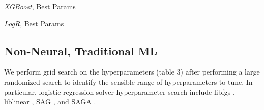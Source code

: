 \documentclass[11pt]{article}
\begin{document}
\begin{table}
\begin{subtable}{0.23\textwidth}
\centering
{}
\caption{\textit{XGBoost}, Best Params }\label{tabla4.1}
\end{subtable}
    \hfil
\begin{subtable}{0.23\textwidth}
\centering
{}
\caption{\textit{LogR}, Best Params }\label{tabla4.1}
\end{subtable}
\caption{Hyperparameters, non-neural models.}
\end{table}
\subsection{Non-Neural, Traditional ML}
We perform grid search on the hyperparameters (table 3) after performing a large randomized search to identify the sensible range of hyperparameters to tune. In particular, logistic regression solver hyperparameter search include libfgs \citep{zhu2011bfgs}, liblinear \citep{fan2008liblinear}, SAG \citep{schmidt2017minimizing}, and SAGA \citep{defazio2014saga}. 
\end{document}

